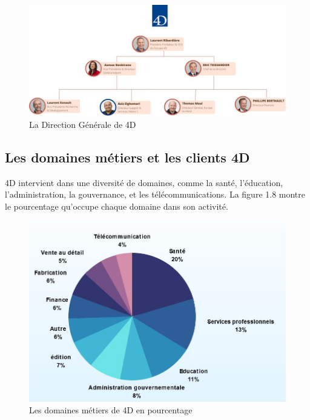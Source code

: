 \begin{figure}[h]
    \centering
    \includegraphics[scale=0.6]{Figures/direction.jpg} %
    \caption{La Direction Générale de 4D}
    \label{fig:direction}
\end{figure}

\subsection{Les domaines métiers et les clients 4D}
4D intervient dans une diversité de domaines, comme 
la santé, l’éducation, l’administration, la gouvernance, 
et les télécommunications. La figure 1.8 montre le pourcentage 
qu’occupe chaque domaine dans son activité.

\begin{figure}[h]
    \centering
    \includegraphics[scale=0.7]{Figures/domaineMetier.jpg} %
    \caption{Les domaines métiers de 4D en pourcentage}
    \label{fig:domaineMetier}
\end{figure}


